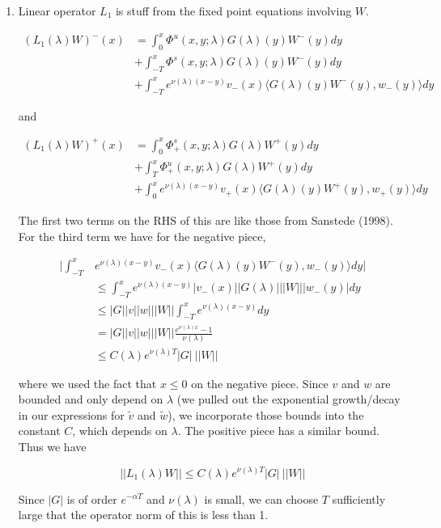 \documentclass[12pt]{article}
\begin{document}
\begin{enumerate}

\item Linear operator $L_1$ is stuff from the fixed point equations involving $W$.

\begin{align*}
(L_1(\lambda)W)^-(x) &= \int_0^x \Phi^u(x, y; \lambda) G(\lambda)(y)W^-(y) dy \\
&+ \int_{-T}^x \Phi^s(x, y; \lambda) G(\lambda)(y)W^-(y) dy \\
&+ \int_{-T}^x 
e^{\nu(\lambda)(x-y)} v_-(x) \langle G(\lambda)(y)W^-(y), w_-(y) \rangle dy 
\end{align*}

and

\begin{align*}
(L_1(\lambda)W)^+(x) &= \int_0^x \Phi^s_+(x, y; \lambda) G(\lambda)W^+(y) dy \\
&+ \int_T^x \Phi^u_+(x, y; \lambda) G(\lambda)W^+(y) dy \\
&+ \int_0^x e^{\nu(\lambda)(x-y)} v_+(x) \langle G(\lambda)(y)W^+(y), w_+(y) \rangle dy
\end{align*}

The first two terms on the RHS of this are like those from Sanstede (1998). For the third term we have for the negative piece,

\begin{align*}
\Big| \int_{-T}^x &e^{\nu(\lambda)(x-y)} v_-(x) \langle G(\lambda)(y)W^-(y), w_-(y) \rangle dy \Big| \\
&\leq \int_{-T}^x e^{\nu(\lambda)(x-y)} |v_-(x)| |G(\lambda)|||W|||w_-(y)|dy \\
&\leq |G||v||w|||W|| \int_{-T}^x e^{\nu(\lambda)(x-y)} dy \\
&= |G||v||w|||W|| \frac{e^{\nu(\lambda)x} - 1}{\nu(\lambda)} \\
&\leq C(\lambda) e^{\nu(\lambda)T} |G| \: ||W||
\end{align*}

where we used the fact that $x \leq 0$ on the negative piece. Since $v$ and $w$ are bounded and only depend on $\lambda$ (we pulled out the exponential growth/decay in our expressions for $\tilde{v}$ and $\tilde{w}$), we incorporate those bounds into the constant $C$, which depends on $\lambda$. The positive piece has a similar bound. Thus we have

\[
||L_1(\lambda)W|| \leq C(\lambda) e^{\nu(\lambda)T} |G| \: ||W||
\]

Since $|G|$ is of order $e^{-\alpha T}$ and $\nu(\lambda)$ is small, we can choose $T$ sufficiently large that the operator norm of this is less than 1.


\end{enumerate}
\end{document}
